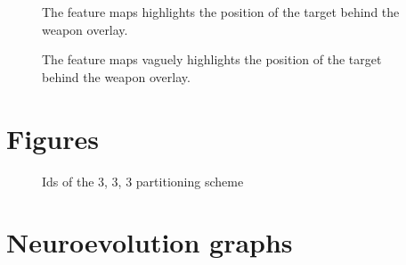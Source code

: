 \begin{figure}[H]
	\begin{center}
	\begin{scriptsize}
		\sffamily
		
	\end{scriptsize}
	\end{center}
	\caption[Feature maps]{The feature maps highlights the position of the target behind the weapon overlay.}
\end{figure}

\begin{figure}[H]
	\begin{center}
	\begin{scriptsize}
		\sffamily
		
	\end{scriptsize}
	\end{center}
	\caption[Feature maps]{The feature maps vaguely highlights the position of the target behind the weapon overlay.}
\end{figure}


\section{Figures}

\begin{figure}[H]
	\begin{scriptsize}
		\sffamily
		\def\svgwidth{\textwidth}
		
	\end{scriptsize}
	\caption{Ids of the 3, 3, 3 partitioning scheme}
	\label{fig:ids}
\end{figure}

\section{Neuroevolution graphs}
\label{sec:neuroevolution-graphs}













